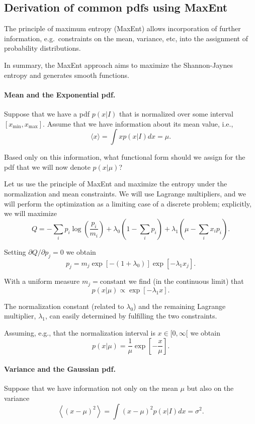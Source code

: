 \documentclass[%
oneside,                 %
final,                   %
10pt]{article}
\begin{document}
\noindent
\subsection{Derivation of common pdfs using MaxEnt}

The principle of maximum entropy (MaxEnt) allows incorporation of further information, e.g.~constraints on the mean, variance, etc, into the assignment of probability distributions.

In summary, the MaxEnt approach aims to maximize the Shannon-Jaynes entropy and generates smooth functions.

\paragraph{Mean and the Exponential pdf.}
Suppose that we have a pdf $p(x|I)$ that is normalized over some interval $[ x_\mathrm{min}, x_\mathrm{max}]$. Assume that we have information about its mean value, i.e.,
\[
\langle x \rangle = \int x p(x|I) dx = \mu.
\]

Based only on this information, what functional form should we assign for the pdf that we will now denote $p(x|\mu)$? 

Let us use the principle of MaxEnt and maximize the entropy under the normalization and mean constraints. We will use Lagrange multipliers, and we will perform the optimization as a limiting case of a discrete problem; explicitly, we will maximize
\[
Q = -\sum_i p_i \log \left( \frac{p_i}{m_i} \right) + \lambda_0 \left( 1 - \sum_i p_i \right) + \lambda_1 \left( \mu - \sum_i x_i p_i \right).
\]

Setting $\partial Q / \partial p_j = 0$ we obtain
\[
p_j = m_j \exp \left[ -(1+\lambda_0) \right] \exp \left[ -\lambda_1 x_j \right].
\]

With a uniform measure $m_j = \mathrm{constant}$ we find (in the continuous limit) that
\[
p(x|\mu) \propto \exp \left[ -\lambda_1 x \right].
\]

The normalization constant (related to $\lambda_0$) and the remaining Lagrange multiplier, $\lambda_1$, can easily determined by fulfilling the two constraints. 

Assuming, e.g., that the normalization interval is $x \in [0, \infty[$ we obtain
\[
p(x|\mu) = \frac{1}{\mu} \exp \left[ -\frac{x}{\mu} \right].
\]

\paragraph{Variance and the Gaussian pdf.}
Suppose that we have information not only on the mean $\mu$ but also on the variance
\[
\left\langle (x-\mu)^2 \right\rangle = \int (x-\mu)^2 p(x|I) dx = \sigma^2.
\]
\end{document}
